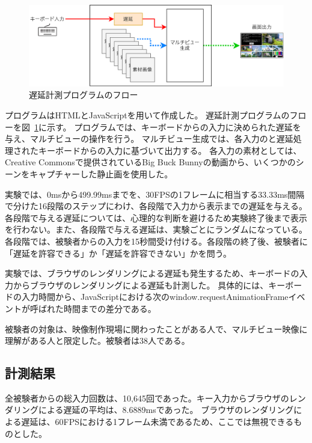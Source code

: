 \newpage
\begin{figure}[htbp]
  \begin{center}
    \includegraphics[bb=0 0 629 201,width=15.5cm]{img/mv-delay-diagram.pdf}
  \end{center}
  \caption{遅延計測プログラムのフロー}
  \label{fig:mv-delay-diagram}
\end{figure}

プログラムはHTMLとJavaScriptを用いて作成した。
遅延計測プログラムのフローを図~\ref{fig:mv-delay-diagram}に示す。
プログラムでは、キーボードからの入力に決められた遅延を与え、マルチビューの操作を行う。
マルチビュー生成では、各入力のと遅延処理されたキーボードからの入力に基づいて出力する。
各入力の素材としては、Creative Commonsで提供されているBig Buck Bunny\cite{big-buck-bunny}の動画から、いくつかのシーンをキャプチャーした静止画を使用した。

実験では、0msから499.99msまでを、30FPSの1フレームに相当する33.33ms間隔で分けた16段階のステップにわけ、各段階で入力から表示までの遅延を与える。
各段階で与える遅延については、心理的な判断を避けるため実験終了後まで表示を行わない。また、各段階で与える遅延は、実験ごとにランダムになっている。
各段階では、被験者からの入力を15秒間受け付ける。各段階の終了後、被験者に「遅延を許容できる」か「遅延を許容できない」かを問う。

実験では、ブラウザのレンダリングによる遅延も発生するため、キーボードの入力からブラウザのレンダリングによる遅延も計測した。
具体的には、キーボードの入力時間から、JavaScriptにおける次のwindow.requestAnimationFrameイベントが呼ばれた時間までの差分である。

被験者の対象は、映像制作現場に関わったことがある人で、マルチビュー映像に理解がある人と限定した。被験者は38人である。

\subsection{計測結果}

全被験者からの総入力回数は、10,645回であった。キー入力からブラウザのレンダリングによる遅延の平均は、8.6889msであった。
ブラウザのレンダリングによる遅延は、60FPSにおける1フレーム未満であるため、ここでは無視できるものとした。

